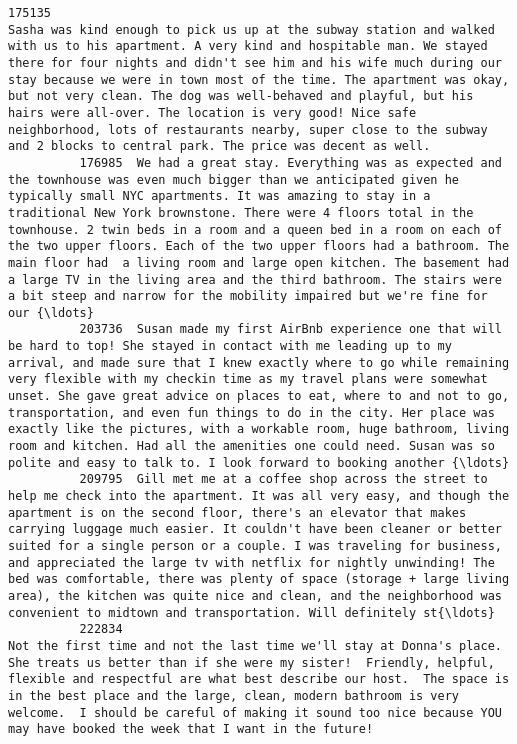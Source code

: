 \documentclass[11pt]{article}
\begin{document}
\begin{Verbatim}[commandchars=\\\{\}]
          175135                                                                        Sasha was kind enough to pick us up at the subway station and walked with us to his apartment. A very kind and hospitable man. We stayed there for four nights and didn't see him and his wife much during our stay because we were in town most of the time. The apartment was okay, but not very clean. The dog was well-behaved and playful, but his hairs were all-over. The location is very good! Nice safe neighborhood, lots of restaurants nearby, super close to the subway and 2 blocks to central park. The price was decent as well.   
          176985  We had a great stay. Everything was as expected and the townhouse was even much bigger than we anticipated given he typically small NYC apartments. It was amazing to stay in a traditional New York brownstone. There were 4 floors total in the townhouse. 2 twin beds in a room and a queen bed in a room on each of the two upper floors. Each of the two upper floors had a bathroom. The main floor had  a living room and large open kitchen. The basement had a large TV in the living area and the third bathroom. The stairs were a bit steep and narrow for the mobility impaired but we're fine for our {\ldots}   
          203736  Susan made my first AirBnb experience one that will be hard to top! She stayed in contact with me leading up to my arrival, and made sure that I knew exactly where to go while remaining very flexible with my checkin time as my travel plans were somewhat unset. She gave great advice on places to eat, where to and not to go, transportation, and even fun things to do in the city. Her place was exactly like the pictures, with a workable room, huge bathroom, living room and kitchen. Had all the amenities one could need. Susan was so polite and easy to talk to. I look forward to booking another {\ldots}   
          209795  Gill met me at a coffee shop across the street to help me check into the apartment. It was all very easy, and though the apartment is on the second floor, there's an elevator that makes carrying luggage much easier. It couldn't have been cleaner or better suited for a single person or a couple. I was traveling for business, and appreciated the large tv with netflix for nightly unwinding! The bed was comfortable, there was plenty of space (storage + large living area), the kitchen was quite nice and clean, and the neighborhood was convenient to midtown and transportation. Will definitely st{\ldots}   
          222834                                                                                                                                                                                                             Not the first time and not the last time we'll stay at Donna's place.  She treats us better than if she were my sister!  Friendly, helpful, flexible and respectful are what best describe our host.  The space is in the best place and the large, clean, modern bathroom is very welcome.  I should be careful of making it sound too nice because YOU may have booked the week that I want in the future!   

\end{Verbatim}
\end{document}
